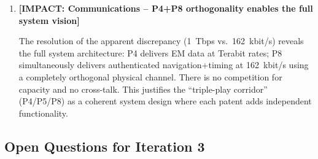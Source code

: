 \documentclass[aps,prd,twocolumn,superscriptaddress,nofootinbib,longbibliography]{revtex4-2}
\begin{document}
\begin{enumerate}
\item \textbf{[IMPACT: Communications -- P4+P8 orthogonality enables the full system vision]}

The resolution of the apparent discrepancy (1~Tbps vs.\ 162~kbit/s)
reveals the full system architecture: P4 delivers EM data at
Terabit rates; P8 simultaneously delivers authenticated
navigation+timing at 162~kbit/s using a completely orthogonal
physical channel.  There is no competition for capacity and no
cross-talk.  This justifies the ``triple-play corridor'' (P4/P5/P8)
as a coherent system design where each patent adds independent
functionality.

\end{enumerate}

\subsection{Open Questions for Iteration 3}
\label{sec:open}
\end{document}
